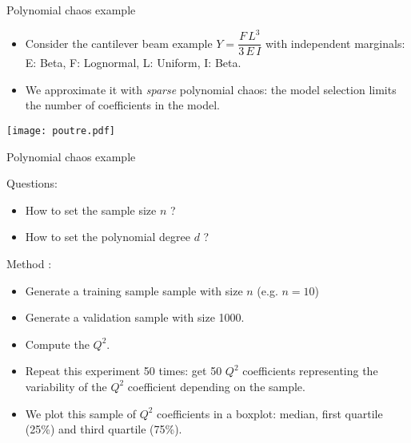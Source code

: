 \documentclass{beamer}
\begin{document}

\begin{frame}[t]{Polynomial chaos example}

\begin{example}
\begin{itemize}
\item Consider the cantilever beam example $Y  = \dfrac{F\, L^3}{3 \, E \, I}$
with independent marginals: E: Beta, F: Lognormal, L: Uniform, 
I: Beta.

\item We approximate it with \emph{sparse} polynomial chaos: the model 
selection limits the number of coefficients in the model.
\end{itemize}

\end{example}

\begin{center}
 \texttt{[image: poutre.pdf]}
\end{center}

\end{frame}


\begin{frame}[t]{Polynomial chaos example}

Questions:
\begin{itemize}
\item How to set the sample size $n$ ?
\item How to set the polynomial degree $d$ ?
\end{itemize}

Method \cite{Gratiet2016}:
\begin{itemize}
\item Generate a training sample sample with size $n$ (e.g. $n=10$)
\item Generate a validation sample with size 1000.
\item Compute the $Q^2$. 
\item Repeat this experiment 50 times: get 50 $Q^2$ coefficients 
representing the variability of the $Q^2$ coefficient depending on the 
sample. 
\item We plot this sample of $Q^2$ coefficients in a boxplot: median, 
first quartile (25\%) and third quartile (75\%). 
\end{itemize}
\end{frame}

\end{document}
